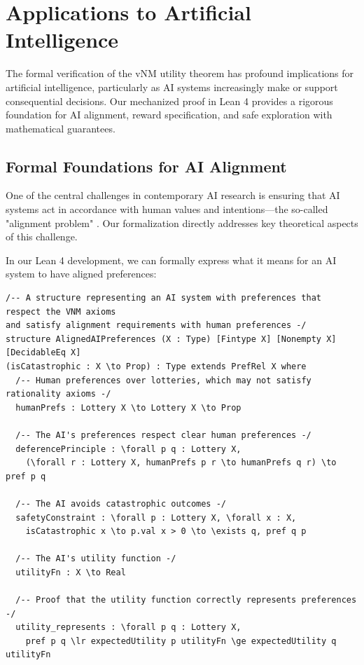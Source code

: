 \documentclass{article}
\theoremstyle{definition}
\begin{document}
\section{Applications to Artificial Intelligence}\label{sec:ai_applications}

The formal verification of the vNM utility theorem has profound implications for artificial intelligence, particularly as AI systems increasingly make or support consequential decisions. Our mechanized proof in Lean 4 provides a rigorous foundation for AI alignment, reward specification, and safe exploration with mathematical guarantees.

\subsection{Formal Foundations for AI Alignment}\label{sec:ai:formal found}

One of the central challenges in contemporary AI research is ensuring that AI systems act in accordance with human values and intentions—the so-called "alignment problem" \cite{Russell2019}. Our formalization directly addresses key theoretical aspects of this challenge.

In our Lean 4 development, we can formally express what it means for an AI system to have aligned preferences:

\begin{lstlisting}[caption={Formal Foundations for AI Alignment: Lean 4 Implementation}]
/-- A structure representing an AI system with preferences that respect the VNM axioms
and satisfy alignment requirements with human preferences -/
structure AlignedAIPreferences (X : Type) [Fintype X] [Nonempty X] [DecidableEq X]
(isCatastrophic : X \to Prop) : Type extends PrefRel X where
  /-- Human preferences over lotteries, which may not satisfy rationality axioms -/
  humanPrefs : Lottery X \to Lottery X \to Prop

  /-- The AI's preferences respect clear human preferences -/
  deferencePrinciple : \forall p q : Lottery X,
    (\forall r : Lottery X, humanPrefs p r \to humanPrefs q r) \to pref p q

  /-- The AI avoids catastrophic outcomes -/
  safetyConstraint : \forall p : Lottery X, \forall x : X,
    isCatastrophic x \to p.val x > 0 \to \exists q, pref q p

  /-- The AI's utility function -/
  utilityFn : X \to Real

  /-- Proof that the utility function correctly represents preferences -/
  utility_represents : \forall p q : Lottery X,
    pref p q \lr expectedUtility p utilityFn \ge expectedUtility q utilityFn

\end{lstlisting}
\end{document}
